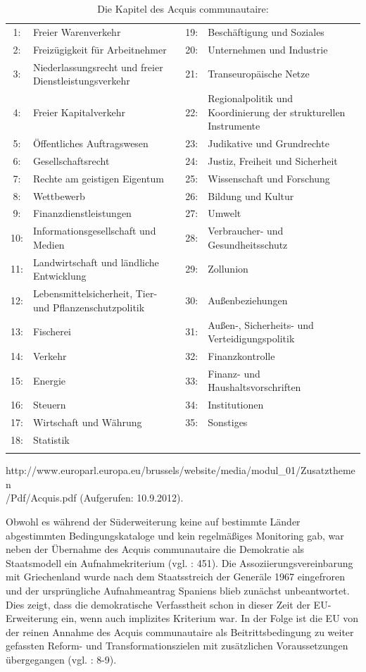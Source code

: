 \begin{table}[H]
\centering
\setlength\belowcaptionskip{10pt}
\caption{Die Kapitel des Acquis communautaire:}
\begin{tabular}{|c p{7cm}|c p{7cm}|}\hline
1:&Freier Warenverkehr&19:&Beschäftigung und Soziales\\
2:&Freizügigkeit für Arbeitnehmer&20:&Unternehmen und Industrie\\
3:&Niederlassungsrecht und freier Dienstleistungsverkehr&21:&Transeuropäische Netze\\
4:&Freier Kapitalverkehr&22:&Regionalpolitik und Koordinierung der strukturellen Instrumente\\
5:&Öffentliches Auftragswesen&23:&Judikative und Grundrechte\\
6:&Gesellschaftsrecht&24:&Justiz, Freiheit und Sicherheit\\
7:&Rechte am geistigen Eigentum&25:&Wissenschaft und Forschung\\
8:&Wettbewerb&26:&Bildung und Kultur\\
9:&Finanzdienstleistungen&27:&Umwelt\\
10:&Informationsgesellschaft und Medien&28:&Verbraucher- und Gesundheitsschutz\\
11:&Landwirtschaft und ländliche Entwicklung&29:&Zollunion\\
12:&Lebensmittelsicherheit, Tier- und Pflanzenschutzpolitik&30:&Außenbeziehungen\\
13:& Fischerei&31:&Außen-, Sicherheits- und Verteidigungspolitik\\
14:&Verkehr&32:&Finanzkontrolle\\
15:&Energie&33:&Finanz- und Haushaltsvorschriften\\
16:&Steuern&34:&Institutionen\\
17:&Wirtschaft und Währung&35:&Sonstiges \\
18:&Statistik&&\\\hline
\multicolumn{4}{c}{}
\end{tabular}
http://www.europarl.europa.eu/brussels/website/media/modul\_01/Zusatzthemen\\/Pdf/Acquis.pdf  (Aufgerufen: 10.9.2012).
\end{table}
Obwohl es während der Süderweiterung keine auf bestimmte Länder abgestimmten Bedingungskataloge und kein regelmäßiges Monitoring gab, war neben der Übernahme des Acquis communautaire die Demokratie als Staatsmodell ein Aufnahmekriterium (vgl. \cite{pridham07} : 451). Die Assoziierungsvereinbarung mit Griechenland wurde nach dem Staatsstreich der Generäle 1967 eingefroren und der ursprüngliche Aufnahmeantrag Spaniens blieb zunächst unbeantwortet. Dies zeigt, dass die demokratische Verfasstheit schon in dieser Zeit der EU-Erweiterung ein, wenn auch implizites Kriterium war. In der Folge ist die EU von der reinen Annahme des Acquis communautaire als Beitrittsbedingung zu weiter gefassten Reform- und Transformationszielen mit zusätzlichen Voraussetzungen übergegangen (vgl. \cite{dimit04} : 8-9).\par
